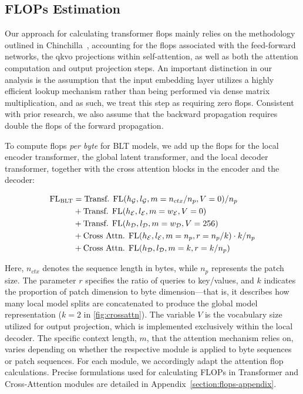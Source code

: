\subsection{FLOPs Estimation} 
\label{section:flops}

Our approach for calculating transformer flops mainly relies on the methodology outlined in Chinchilla~\citep{hoffmann2022training}, accounting for the flops associated with the feed-forward networks, the qkvo projections within self-attention, as well as both the attention computation and output projection steps. An important distinction in our analysis is the assumption that the input embedding layer utilizes a highly efficient lookup mechanism rather than being performed via dense matrix multiplication, and as such, we treat this step as requiring zero flops. Consistent with prior research, we also assume that the backward propagation requires double the flops of the forward propagation.

To compute flops \textit{per byte} for {\textsc BLT} models, we add up the flops for the local encoder transformer, the global latent transformer, and the local decoder transformer, together with the cross attention blocks in the encoder and the decoder:

\begin{align}
    \text{FL}_{\text{{\textsc BLT}}} &= \text{Transf. FL}(h_{\mathcal{G}}, l_{\mathcal{G}}, m=n_{ctx}/n_p, V=0) / n_p \\
    &+ \text{Transf. FL}(h_{\mathcal{E}}, l_{\mathcal{E}}, m=w_{\mathcal{E}}, V=0) \\
    &+ \text{Transf. FL}(h_{\mathcal{D}}, l_{\mathcal{D}}, m=w_{\mathcal{D}}, V=256) \\
    &+ \text{Cross Attn. FL}(h_{\mathcal{E}}, l_{\mathcal{E}}, m=n_p, r=n_p/k) \cdot k/n_p \\
    &+ \text{Cross Attn. FL}(h_{\mathcal{D}}, l_{\mathcal{D}}, m=k, r=k/n_p)
\end{align}

Here, $n_{ctx}$ denotes the sequence length in bytes, while $n_p$ represents the patch size. The parameter $r$ specifies the ratio of queries to key/values, and $k$ indicates the proportion of patch dimension to byte dimension—that is, it describes how many local model splits are concatenated to produce the global model representation ($k=2$ in \autoref{fig:crossattn}). The variable $V$ is the vocabulary size utilized for output projection, which is implemented exclusively within the local decoder. The specific context length, $m$, that the attention mechanism relies on, varies depending on whether the respective module is applied to byte sequences or patch sequences. For each module, we accordingly adapt the attention flop calculations. Precise formulations used for calculating FLOPs in Transformer and Cross-Attention modules are detailed in Appendix~\ref{section:flops-appendix}.

